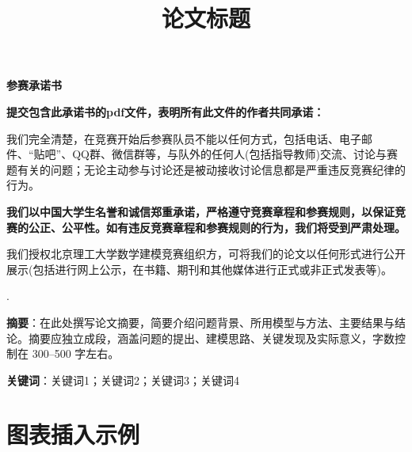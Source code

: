 \documentclass[12pt,a4paper]{article}
\title{论文标题}
\author{}
\date{}
\begin{document}
\begin{center}
    {\Large \bfseries 参赛承诺书}
\end{center}

\vspace{1.5em}

\noindent
\textbf{提交包含此承诺书的pdf文件，表明所有此文件的作者共同承诺：}

\medskip

我们完全清楚，在竞赛开始后参赛队员不能以任何方式，包括电话、电子邮件、“贴吧”、QQ群、微信群等，与队外的任何人(包括指导教师)交流、讨论与赛题有关的问题；无论主动参与讨论还是被动接收讨论信息都是严重违反竞赛纪律的行为。

\medskip

\textbf{我们以中国大学生名誉和诚信郑重承诺，严格遵守竞赛章程和参赛规则，以保证竞赛的公正、公平性。如有违反竞赛章程和参赛规则的行为，我们将受到严肃处理。}

\medskip

我们授权北京理工大学数学建模竞赛组织方，可将我们的论文以任何形式进行公开展示(包括进行网上公示，在书籍、期刊和其他媒体进行正式或非正式发表等)。

\begin{flushright}
\the\year.\the\month
\end{flushright}

\newpage %

\maketitle

\renewenvironment{abstract}
{\par\noindent}
{\par}
\begin{abstract}
\noindent
\textbf{摘要}：在此处撰写论文摘要，简要介绍问题背景、所用模型与方法、主要结果与结论。摘要应独立成段，涵盖问题的提出、建模思路、关键发现及实际意义，字数控制在 300--500 字左右。

\vspace{0.5em}
\noindent
\textbf{关键词}：关键词1；关键词2；关键词3；关键词4
\end{abstract}

\newpage %

\section{图表插入示例}
\end{document}
